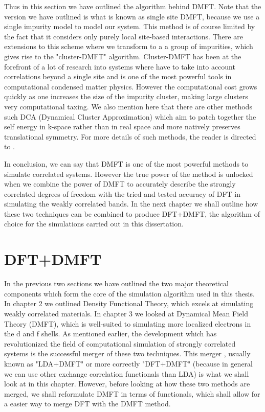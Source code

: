 \documentclass[10pt]{ruthesis}
\begin{document}
Thus in this section we have outlined the algorithm behind DMFT. Note that the version we have outlined is what is known as single site DMFT, because we use a single impurity model to model our system. This method is of course limited by the fact that it considers only purely local site-based interactions. There are extensions to this scheme where we transform to a a group of impurities, which gives rise to the "cluster-DMFT" algorithm. Cluster-DMFT has been at the forefront of a lot of research into systems where have to take into account correlations beyond a single site and is one of the most powerful tools in computational condensed matter physics. However the computational cost grows quickly as one increases the size of the impurity cluster, making large clusters very computational taxing. We also mention here that  there are other methods such DCA (Dynamical Cluster Approximation) which aim to patch together the self energy in k-space rather than in real space and more natively preserves translational symmetry. For more details of such methods, the reader is directed to \cite{Held_Review}. 

In conclusion, we can say that DMFT is one of the most powerful methods to simulate correlated systems. However the true power of the method is unlocked when we combine the power of DMFT to accurately describe the strongly correlated degrees of freedom with the tried and tested accuracy of DFT in simulating the weakly correlated bands. In the next chapter we shall outline how these two techniques can be combined to produce DFT+DMFT, the algorithm of choice for the simulations carried out in this dissertation.  
%

\pagebreak
\chapter{DFT+DMFT}

In the previous two sections we have outlined the two major theoretical components which form the core of the simulation algorithm used in this thesis. In chapter 2 we outlined Density Functional Theory, which excels at simulating weakly correlated materials. In chapter 3 we looked at Dynamical Mean Field Theory (DMFT), which is well-suited to simulating more localized electrons in the d and f shells. As mentioned earlier, the development which has revolutionized the field of computational simulation of strongly correlated systems is the successful merger of these two techniques. This merger , usually known as "LDA+DMFT" or more correctly "DFT+DMFT" (because in general we can use other exchange correlation functionals than LDA) is what we shall look at in this chapter. However, before looking at how these two methods are merged, we shall reformulate DMFT in terms of functionals, which shall allow for a easier way to merge DFT with the DMFT method.
\end{document}
